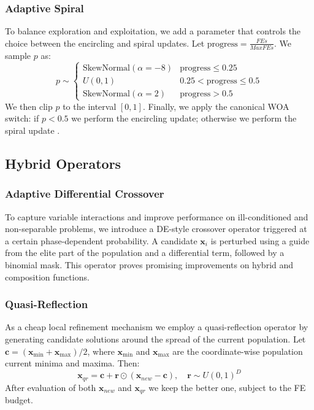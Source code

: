 \documentclass[conference]{IEEEtran}
\begin{document}
\subsubsection{Adaptive Spiral}
To balance exploration and exploitation, we add a parameter that controls the choice between the encircling and spiral updates. Let $\mathrm{progress}=\tfrac{FEs}{MaxFEs}$. We sample $p$ as:
\begin{equation}
    p \sim
    \begin{cases}
        \mathrm{SkewNormal}(\alpha=-8) & \mathrm{progress} \le 0.25 \\
        U(0,1) & 0.25 < \mathrm{progress} \le 0.5 \\
        \mathrm{SkewNormal}(\alpha=2) & \mathrm{progress} > 0.5
    \end{cases}
\end{equation}
We then clip $p$ to the interval $[0,1]$.
Finally, we apply the canonical WOA switch: if $p < 0.5$ we perform the encircling update; otherwise we perform the spiral update \cite{mirjalili2016woa}.

\subsection{Hybrid Operators}
\label{sec:hybrid_ops}

\subsubsection{Adaptive Differential Crossover}
To capture variable interactions and improve performance on ill-conditioned and non-separable problems, we introduce a DE-style crossover operator triggered at a certain phase-dependent probability. A candidate $\mathbf{x}_i$ is perturbed using a guide from the elite part of the population and a differential term, followed by a binomial mask. This operator proves promising improvements on hybrid and composition functions.

\subsubsection{Quasi-Reflection}
As a cheap local refinement mechanism we employ a quasi-reflection operator by generating candidate solutions around the spread of the current population. Let $\mathbf{c} = (\mathbf{x}_{\min} + \mathbf{x}_{\max})/2$, where $\mathbf{x}_{\min}$ and $\mathbf{x}_{\max}$ are the coordinate-wise population current minima and maxima. Then:
\begin{equation}
    \mathbf{x}_{qr} = \mathbf{c} + \mathbf{r} \odot (\mathbf{x}_{new} - \mathbf{c}), \quad \mathbf{r}\sim U(0,1)^D
\end{equation}
After evaluation of both $\mathbf{x}_{new}$ and $\mathbf{x}_{qr}$ we keep the better one, subject to the FE budget.
\end{document}
